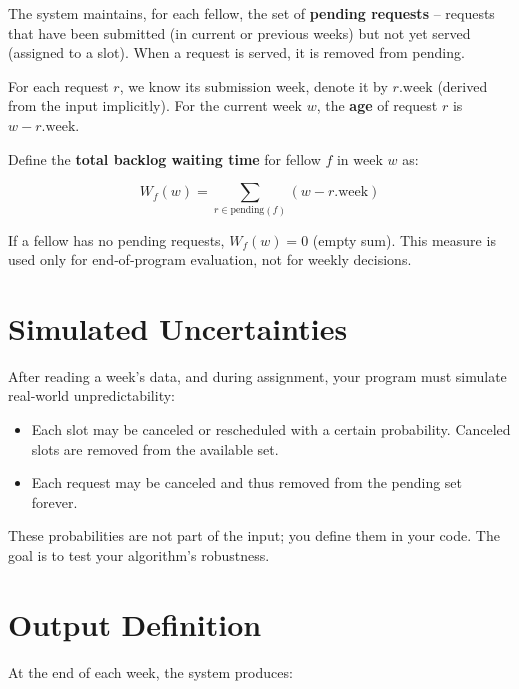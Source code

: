 \documentclass[12pt]{article}
\begin{document}
The system maintains, for each fellow, the set of \textbf{pending requests} – requests that have been submitted (in current or previous weeks) but not yet served (assigned to a slot). When a request is served, it is removed from pending.

\noindent For each request $r$, we know its submission week, denote it by $r.\text{week}$ (derived from the input implicitly). For the current week $w$, the \textbf{age} of request $r$ is $w - r.\text{week}$.

\noindent Define the \textbf{total backlog waiting time} for fellow $f$ in week $w$ as:

\[
W_f(w) = \sum_{r \in \text{pending}(f)} (w - r.\text{week})
\]

\noindent If a fellow has no pending requests, $W_f(w) = 0$ (empty sum). This measure is used only for end‑of‑program evaluation, not for weekly decisions.

\section*{Simulated Uncertainties}

After reading a week's data, and during assignment, your program must simulate real‑world unpredictability:

\begin{itemize}
\item Each slot may be canceled or rescheduled with a certain probability. Canceled slots are removed from the available set.
\item Each request may be canceled and thus removed from the pending set forever.
\end{itemize}

\noindent These probabilities are not part of the input; you define them in your code. The goal is to test your algorithm's robustness.

\section*{Output Definition}

At the end of each week, the system produces:
\end{document}
